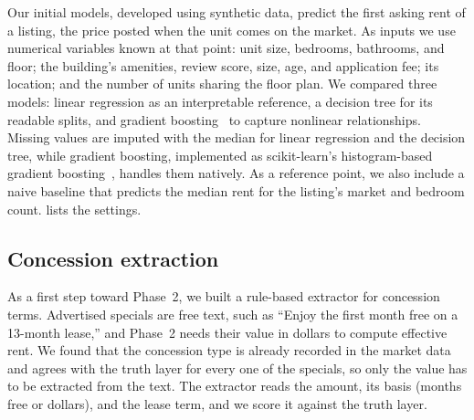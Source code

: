 Our initial models, developed using synthetic data, predict the first asking rent of a listing, 
the price posted when the unit comes on the market. As inputs we use \nFeatures{} numerical 
variables known at that point: unit size, bedrooms,
bathrooms, and floor; the building's amenities, review score, size, age, and application fee; its
location; and the number of units sharing the floor plan. We compared three models: linear
regression as an interpretable reference, a decision tree for its readable splits, and gradient
boosting~\autocite{friedman2001greedy} to capture nonlinear relationships. Missing values are imputed
with the median for linear regression and the decision tree, while gradient boosting, implemented as
scikit-learn's histogram-based gradient boosting~\autocite{ke2017lightgbm, pedregosa2011scikit},
handles them natively. As a reference point, we also include a naive baseline that predicts the
median rent for the listing's market and bedroom count.  lists the settings.


\subsection{Concession extraction}\label{sec:concession-methods}

As a first step toward Phase~2, we built a rule-based extractor for concession terms. Advertised
specials are free text, such as ``Enjoy the first month free on a 13-month lease,'' and Phase~2 needs
their value in dollars to compute effective rent. We found that the concession type is already
recorded in the market data and agrees with the truth layer for every one of the
\nConcessionEvents{} specials, so only the value has to be extracted from the text. The extractor
reads the amount, its basis (months free or dollars), and the lease term, and we score it against
the truth layer.

